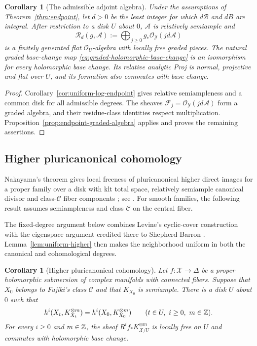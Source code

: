 \documentclass[11pt,a4paper]{article}
\numberwithin{equation}{section}
\newtheorem{corollary}[theorem]{Corollary}
\theoremstyle{definition}
\theoremstyle{remark}
\newcommand{\OO}{\mathcal O}\newcommand{\cX}{\mathcal X}
\begin{document}
\begin{corollary}[The admissible adjoint algebra]
\label{cor:relative-adjoint-algebra}
Under the assumptions of Theorem~\ref{thm:endpoint}, let $d>0$ be the
least integer for which $d\mathcal B$ and $dB$ are integral.
After restriction to a disk $U$ about $0$, $\mathcal A$ is relatively
semiample and
\[
 \mathcal R_d(g,\mathcal A)
 :=\bigoplus_{j\ge0}g_*\OO_{\mathcal Y}(jd\mathcal A)
\]
is a finitely generated flat $\OO_U$-algebra with locally free graded
pieces. The natural graded base-change map
\eqref{eq:graded-holomorphic-base-change} is an isomorphism for every
holomorphic base change. Its relative analytic Proj is normal, projective and
flat over $U$, and its formation also commutes with base change.
\end{corollary}

\begin{proof}
Corollary~\ref{cor:uniform-log-endpoint} gives relative semiampleness
and a common disk for all admissible degrees. The sheaves
$\mathcal F_j=\OO_{\mathcal Y}(jd\mathcal A)$ form a graded algebra,
and their residue-class identities respect multiplication.
Proposition~\ref{prop:endpoint-graded-algebra} applies and proves
the remaining assertions.
\end{proof}

\subsection{Higher pluricanonical cohomology}

Nakayama's theorem gives local freeness of pluricanonical higher
direct images for a proper family over a disk with klt total space,
relatively semiample canonical divisor and class-$\mathcal C$ fiber
components \cite[Corollary~3.15]{Nakayama1987};
see \cite[Proposition~4.6]{LiRaoWang2026}. For smooth families, the
following result assumes semiampleness and class $\mathcal C$ on
the central fiber.

The fixed-degree argument below combines Levine's cyclic-cover
construction with the eigenspace argument credited there to
Shepherd-Barron \cite[Corollary~1.8]{Levine1983}.
Lemma~\ref{lem:uniform-higher} then makes the neighborhood uniform
in both the canonical and cohomological degrees.

\begin{corollary}[Higher pluricanonical cohomology]
\label{cor:smooth-semiample-higher}
Let $f:\mathcal X\to\Delta$ be a proper holomorphic submersion of complex manifolds
with connected fibers. Suppose that $X_0$ belongs to Fujiki's
class $\mathcal C$ and that $K_{X_0}$ is semiample.
There is a disk $U$ about $0$ such that
\[
 h^i(X_t,K_{X_t}^{\otimes m})
 =h^i(X_0,K_{X_0}^{\otimes m})
 \qquad(t\in U,\ i\ge0,\ m\in\mathbb Z).
\]
For every $i\ge0$ and $m\in\mathbb Z$, the sheaf
$R^if_*K_{\mathcal X/U}^{\otimes m}$ is locally free on $U$ and
commutes with holomorphic base change.
\end{corollary}
\end{document}
